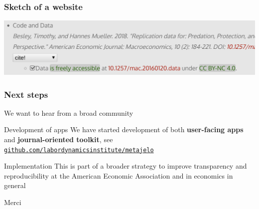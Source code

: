 \begin{frame}
\frametitle{Sketch of a website}
\includegraphics[width=0.8\paperwidth]{images/aeaweb-demo2.png}
\end{frame}



\begin{frame}
\frametitle{Next steps}
\begin{block}{We want to hear from a broad community} 
\end{block}
\begin{block}{Development of apps}
	We have started development of both \textbf{user-facing apps} and \textbf{journal-oriented toolkit}, see \texttt{\href{https://github.com/labordynamicsinstitute/metajelo}{github.com/labordynamicsinstitute/metajelo}}
\end{block}
\begin{block}{Implementation}
	This is part of a broader strategy to improve transparency and reproducibility at the American Economic Association and in economics in general
\end{block}
\end{frame}


\begin{frame}
\centering \Huge Merci
\end{frame}
